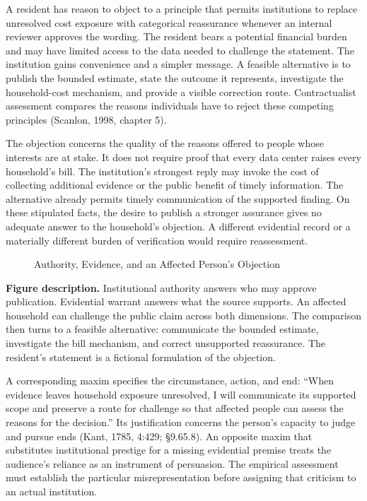 \noindent \noindent A resident has reason to object to a principle that permits
institutions to replace unresolved cost exposure with categorical
reassurance whenever an internal reviewer approves the wording. The
resident bears a potential financial burden and may have limited access
to the data needed to challenge the statement. The institution gains
convenience and a simpler message. A feasible alternative is to publish
the bounded estimate, state the outcome it represents, investigate the
household-cost mechanism, and provide a visible correction route.
Contractualist assessment compares the reasons individuals have to
reject these competing principles (Scanlon, 1998, chapter 5).

The objection concerns the quality of the reasons offered to people
whose interests are at stake. It does not require proof that every data
center raises every household's bill. The institution's strongest reply
may invoke the cost of collecting additional evidence or the public
benefit of timely information. The alternative already permits timely
communication of the supported finding. On these stipulated facts, the
desire to publish a stronger assurance gives no adequate answer to the
household's objection. A different evidential record or a materially
different burden of verification would require reassessment.

\begin{figure}[htbp]
\centering

\caption{Authority, Evidence, and an Affected Person’s Objection}\label{fig:M09_authority_and_warrant}
\end{figure}

\textbf{Figure description.} Institutional authority answers who may
approve publication. Evidential warrant answers what the source
supports. An affected household can challenge the public claim across
both dimensions. The comparison then turns to a feasible alternative:
communicate the bounded estimate, investigate the bill mechanism, and
correct unsupported reassurance. The resident's statement is a fictional
formulation of the objection.

A corresponding maxim specifies the circumstance, action, and end:
``When evidence leaves household exposure unresolved, I will communicate
its supported scope and preserve a route for challenge so that affected
people can assess the reasons for the decision.'' Its justification
concerns the person's capacity to judge and pursue ends (Kant, 1785,
4:429; §9.65.8). An opposite maxim that substitutes institutional
prestige for a missing evidential premise treats the audience's reliance
as an instrument of persuasion. The empirical assessment must establish
the particular misrepresentation before assigning that criticism to an
actual institution.

